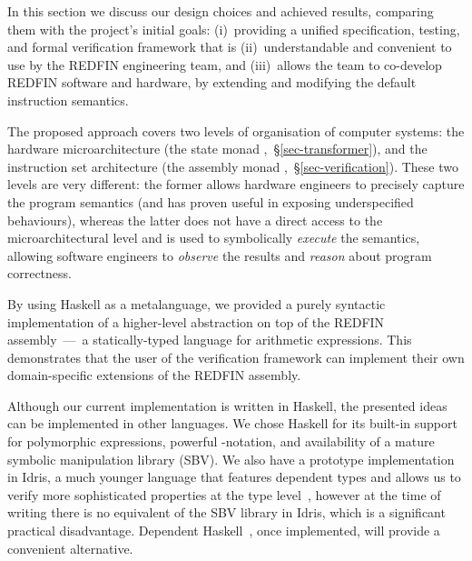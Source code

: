 
In this section we discuss our design choices and achieved
results, comparing them with the project's initial goals: (i)~providing a unified
specification, testing, and formal verification framework that is (ii)~understandable
and convenient to use by the REDFIN engineering team, and (iii)~allows the team
to co-develop REDFIN software and hardware, by extending and modifying the
default instruction semantics.


The proposed approach covers two levels of organisation of computer systems: the
hardware microarchitecture (the state monad ,~\S\ref{sec-transformer}),
and the instruction set architecture (the assembly monad
,~\S\ref{sec-verification}). These two levels are very different: the
former allows hardware engineers to precisely capture the program semantics (and
has proven useful in exposing underspecified behaviours), whereas the latter does
not have a direct access to the microarchitectural level and is used to
symbolically \emph{execute} the semantics, allowing software engineers to
\emph{observe} the results and \emph{reason} about program correctness.

By using Haskell as a metalanguage, we provided a purely syntactic implementation
of a higher-level abstraction on top of the REDFIN assembly~---~a statically-typed
language for arithmetic expressions. This demonstrates that the user
of the verification framework can implement their own domain-specific
extensions of the REDFIN assembly.

Although our current implementation is written in Haskell, the presented ideas
can be implemented in other languages. We chose Haskell for its built-in
support for polymorphic expressions, powerful -notation, and availability
of a mature symbolic manipulation library (SBV). We also have a prototype
implementation in Idris, a much younger language that features dependent
types and allows us to verify more sophisticated properties at the type
level~\cite{JFP:9060502}, however at the time of writing there is no equivalent
of the SBV library in Idris, which is a significant practical disadvantage.
Dependent Haskell~\cite{weirich2017dependent}, once implemented, will provide
a convenient alternative.

